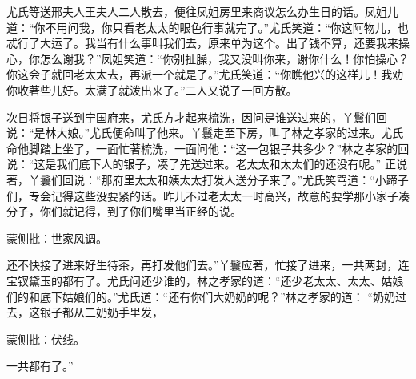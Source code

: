 \begin{parag}


    尤氏等送邢夫人王夫人二人散去，便往凤姐房里来商议怎么办生日的话。凤姐儿道：“你不用问我，你只看老太太的眼色行事就完了。”尤氏笑道：“你这阿物儿，也忒行了大运了。我当有什么事叫我们去，原来单为这个。出了钱不算，还要我来操心，你怎么谢我？”凤姐笑道：“你别扯臊，我又没叫你来，谢你什么！你怕操心？你这会子就回老太太去，再派一个就是了。”尤氏笑道：“你瞧他兴的这样儿！我劝你收著些儿好。太满了就泼出来了。”二人又说了一回方散。
\end{parag}


\begin{parag}


    次日将银子送到宁国府来，尤氏方才起来梳洗，因问是谁送过来的，丫鬟们回说：“是林大娘。”尤氏便命叫了他来。丫鬟走至下房，叫了林之孝家的过来。尤氏命他脚踏上坐了，一面忙著梳洗，一面问他：“这一包银子共多少？”林之孝家的回说：“这是我们底下人的银子，凑了先送过来。老太太和太太们的还没有呢。” 正说著，丫鬟们回说：“那府里太太和姨太太打发人送分子来了。”尤氏笑骂道：“小蹄子们，专会记得这些没要紧的话。昨儿不过老太太一时高兴，故意的要学那小家子凑分子，你们就记得，到了你们嘴里当正经的说。\begin{note}蒙侧批：世家风调。\end{note}还不快接了进来好生待茶，再打发他们去。”丫鬟应著，忙接了进来，一共两封，连宝钗黛玉的都有了。尤氏问还少谁的，林之孝家的道：“还少老太太、太太、姑娘们的和底下姑娘们的。”尤氏道：“还有你们大奶奶的呢？”林之孝家的道： “奶奶过去，这银子都从二奶奶手里发，\begin{note}蒙侧批：伏线。\end{note}一共都有了。”
\end{parag}


